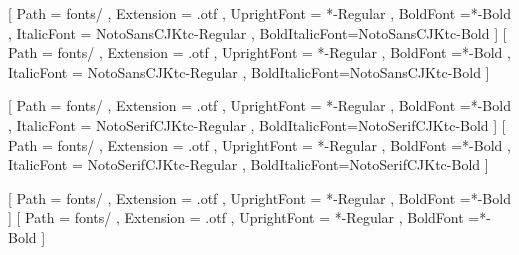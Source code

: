 \usepackage{newtxtext}
\usepackage{amsmath}
\usepackage{amsthm}

\usepackage{notomath}
\usepackage{xeCJK}

[
	Path		= fonts/ ,
	Extension	= .otf ,
	UprightFont	= *-Regular ,
	BoldFont	=*-Bold ,
	ItalicFont	= NotoSansCJKtc-Regular ,
	BoldItalicFont=NotoSansCJKtc-Bold
]
\setmainfont{NotoSerifCJKtc}[
	Path		= fonts/ ,
	Extension	= .otf ,
	UprightFont	= *-Regular ,
	BoldFont	=*-Bold ,
	ItalicFont	= NotoSansCJKtc-Regular ,
	BoldItalicFont=NotoSansCJKtc-Bold
]

[
	Path		= fonts/ ,
	Extension	= .otf ,
	UprightFont	= *-Regular ,
	BoldFont	=*-Bold ,
	ItalicFont	= NotoSerifCJKtc-Regular ,
	BoldItalicFont=NotoSerifCJKtc-Bold
]
\setsansfont{NotoSansCJKtc}[
	Path		= fonts/ ,
	Extension	= .otf ,
	UprightFont	= *-Regular ,
	BoldFont	=*-Bold ,
	ItalicFont	= NotoSerifCJKtc-Regular ,
	BoldItalicFont=NotoSerifCJKtc-Bold
]

[
	Path		= fonts/ ,
	Extension	= .otf ,
	UprightFont	= *-Regular ,
	BoldFont	=*-Bold
]
\setmonofont{NotoSansMonoCJKtc}[
	Path		= fonts/ ,
	Extension	= .otf ,
	UprightFont	= *-Regular ,
	BoldFont	=*-Bold
]
